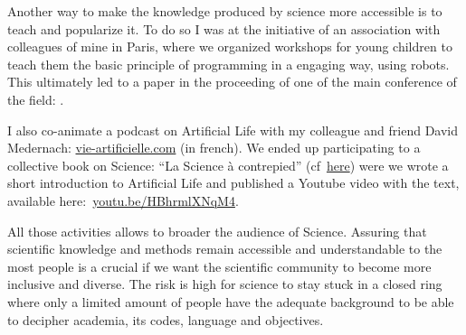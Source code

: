 \documentclass[10pt]{article}
\begin{document}
Another way to make the knowledge produced by science more accessible is to teach and popularize it. To do so I was at the initiative of an association with colleagues of mine in Paris, where we organized workshops for young children to teach them the basic principle of programming in a engaging way, using robots. This ultimately led to a paper in the proceeding of one of the main conference of the field: \cite{gaudiello2010representations}.

I also co-animate a podcast on Artificial Life with my colleague and friend David Medernach: \href{http://vie-artificielle.com/}{vie-artificielle.com} (in french). We ended up participating to a collective book on Science: ``La Science \`a  contrepied'' (cf~\href{https://www.belin-editeur.com/la-science-contrepied}{here}) were we wrote a short introduction to Artificial Life and published a Youtube video with the text, available here:~\href{https://www.youtube.com/watch?v=HBhrmlXNqM4}{youtu.be/HBhrmlXNqM4}. 

All those activities allows to broader the audience of Science. Assuring that scientific knowledge and methods remain accessible and understandable to the most people is a crucial if we want the scientific community to become more inclusive and diverse. The risk is high for science to stay stuck in a closed ring where only a limited amount of people have the adequate background to be able to decipher academia, its codes, language and objectives.





                   
\end{document}
